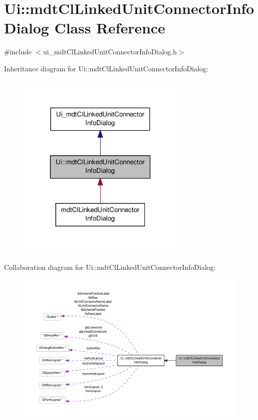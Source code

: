 \hypertarget{class_ui_1_1mdt_cl_linked_unit_connector_info_dialog}{\section{Ui\-:\-:mdt\-Cl\-Linked\-Unit\-Connector\-Info\-Dialog Class Reference}
\label{class_ui_1_1mdt_cl_linked_unit_connector_info_dialog}
}


{\ttfamily \#include $<$ui\-\_\-mdt\-Cl\-Linked\-Unit\-Connector\-Info\-Dialog.\-h$>$}



Inheritance diagram for Ui\-:\-:mdt\-Cl\-Linked\-Unit\-Connector\-Info\-Dialog\-:
\nopagebreak
\begin{figure}[H]
\begin{center}
\leavevmode
\includegraphics[width=230pt]{class_ui_1_1mdt_cl_linked_unit_connector_info_dialog__inherit__graph}
\end{center}
\end{figure}


Collaboration diagram for Ui\-:\-:mdt\-Cl\-Linked\-Unit\-Connector\-Info\-Dialog\-:
\nopagebreak
\begin{figure}[H]
\begin{center}
\leavevmode
\includegraphics[width=350pt]{class_ui_1_1mdt_cl_linked_unit_connector_info_dialog__coll__graph}
\end{center}
\end{figure}
